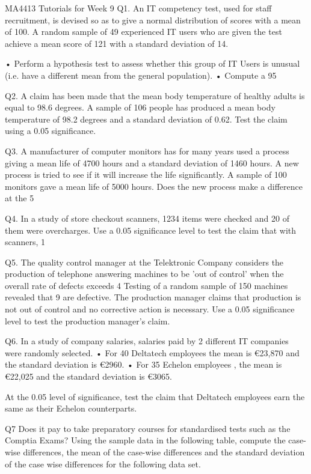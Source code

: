 MA4413 Tutorials for Week 9
Q1. An IT competency test, used for staff recruitment, is devised so as to give a normal distribution of scores with a mean of 100. A random sample of 49 experienced IT users  who are given the test achieve a mean score of 121 with a standard deviation of 14. 

•	Perform a hypothesis test to assess whether this group of IT Users is unusual (i.e. have a different mean from the general population).
•	Compute a 95%

Q2. A claim has been made that the mean body temperature of healthy adults is equal to 98.6 degrees. 
A sample of 106 people has produced a mean body temperature of 98.2 degrees and a standard deviation of 0.62. Test the claim using a 0.05 significance.

Q3. A manufacturer of computer monitors  has for many years used a process giving a mean life of 4700 hours and a standard deviation of 1460 hours. 
A new process is tried to see if it will increase the life significantly. A sample of 100 monitors gave a mean life of 5000 hours.  
Does the new process make a difference at the 5%

Q4. In a study of store checkout scanners, 1234 items were checked and 20 of them were overcharges.
Use a 0.05 significance level to test the claim that with scanners, 1%

Q5. The quality control manager at the Telektronic Company considers the production of telephone answering machines to be ’out of control’ when the overall rate of defects exceeds 4%
Testing of a random sample of 150 machines revealed that 9 are defective. The production manager claims that production is not out of control and no corrective action is necessary. Use a 0.05 significance level to test the production manager’s claim.




Q6. In a study of company salaries, salaries paid by 2 different IT companies were randomly selected.
•	For 40 Deltatech employees the mean is €23,870 and the standard deviation is €2960. 
•	For 35 Echelon employees , the mean is €22,025 and the standard deviation is €3065. 

At the 0.05 level of significance, test the claim that Deltatech employees earn the same as their  Echelon counterparts.

Q7 Does it pay to take preparatory courses for standardised tests such as the Comptia Exams? 
Using the sample data in the following table, compute the case-wise differences, the mean of the case-wise differences and the standard deviation of the case wise differences for the following data set.

